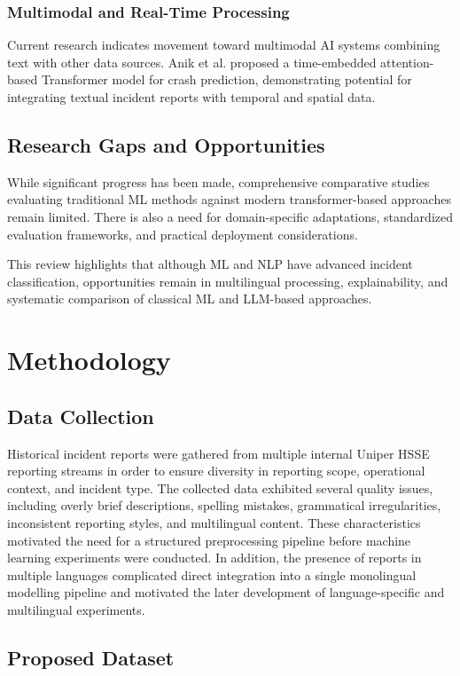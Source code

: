 \documentclass[11pt, titlepage, bibliography=totoc]{scrreprt}
\begin{document}
\subsection{Multimodal and Real-Time Processing}
Current research indicates movement toward multimodal AI systems combining text with other data sources. Anik et al. \cite{anik2024} proposed a time-embedded attention-based Transformer model for crash prediction, demonstrating potential for integrating textual incident reports with temporal and spatial data.

\section{Research Gaps and Opportunities}
While significant progress has been made, comprehensive comparative studies evaluating traditional ML methods against modern transformer-based approaches remain limited. There is also a need for domain-specific adaptations, standardized evaluation frameworks, and practical deployment considerations.

This review highlights that although ML and NLP have advanced incident classification, opportunities remain in multilingual processing, explainability, and systematic comparison of classical ML and LLM-based approaches.

\chapter{Methodology}

\section{Data Collection}
Historical incident reports were gathered from multiple internal Uniper HSSE reporting streams in order to ensure diversity in reporting scope, operational context, and incident type. The collected data exhibited several quality issues, including overly brief descriptions, spelling mistakes, grammatical irregularities, inconsistent reporting styles, and multilingual content. These characteristics motivated the need for a structured preprocessing pipeline before machine learning experiments were conducted. In addition, the presence of reports in multiple languages complicated direct integration into a single monolingual modelling pipeline and motivated the later development of language-specific and multilingual experiments.

\section{Proposed Dataset}
\end{document}
